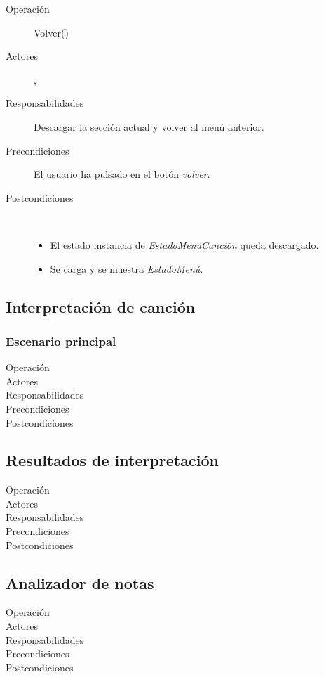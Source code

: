 \begin{description}
\item[Operación] Volver()
\item[Actores] \jugador, \sistema
\item[Responsabilidades] Descargar la sección actual y volver al menú anterior.
\item[Precondiciones] El usuario ha pulsado en el botón \textit{volver}.
\item[Postcondiciones] $\quad$
  \begin{itemize}
  \item El estado instancia de \textit{EstadoMenuCanción} queda descargado.
  \item Se carga y se muestra \textit{EstadoMenú}.
  \end{itemize}
\end{description}

\subsection{Interpretación de canción}

\subsubsection{Escenario principal}

\begin{description}
\item[Operación] 
\item[Actores]
\item[Responsabilidades]
\item[Precondiciones]
\item[Postcondiciones]
\end{description}

\subsection{Resultados de interpretación}
\begin{description}
\item[Operación] 
\item[Actores]
\item[Responsabilidades]
\item[Precondiciones]
\item[Postcondiciones]
\end{description}

\subsection{Analizador de notas}
\begin{description}
\item[Operación] 
\item[Actores]
\item[Responsabilidades]
\item[Precondiciones]
\item[Postcondiciones]
\end{description}


